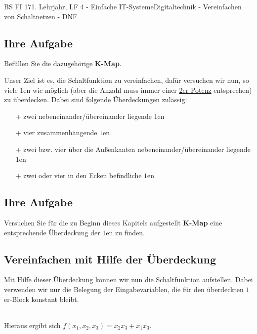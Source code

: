 \documentclass[11pt,twocolumn,oneside,openany,headings=optiontotoc,11pt,numbers=noenddot]{article}
\begin{document}
\begin{worksheet}{BS FI 17}{1. Lehrjahr, LF 4 - Einfache IT-Systeme}{Digitaltechnik - Vereinfachen von Schaltnetzen - DNF}
		\subsection*{Ihre Aufgabe} Befüllen Sie die dazugehörige \textbf{K-Map}.
		\begin{karnaugh-map}[4][4][1][$x_3x_4$][$x_1x_2$]
			
		\end{karnaugh-map}
		Unser Ziel ist es, die Schaltfunktion zu vereinfachen, dafür versuchen wir nun, so viele \(1\)en wie möglich (aber die Anzahl muss immer einer \underline{2er Potenz} entsprechen) zu überdecken. Dabei sind folgende Überdeckungen zulässig:
		\begin{itemize}
			\item[+] zwei nebeneinander/übereinander liegende \(1\)en
			\item[+] vier zusammenhängende \(1\)en
			\item[+] zwei bzw. vier über die Außenkanten nebeneinander/übereinander liegende \(1\)en
			\item[+] zwei oder vier in den Ecken befindliche \(1\)en
		\end{itemize}
		\begin{karnaugh-map}[4][4][1][$x_3x_4$][$x_1x_2$]
		\end{karnaugh-map}
		\begin{karnaugh-map}[4][4][1][$x_3x_4$][$x_1x_2$]
		\end{karnaugh-map}
		\begin{karnaugh-map}[4][4][1][$x_3x_4$][$x_1x_2$]
		\end{karnaugh-map}
		\begin{karnaugh-map}[4][4][1][$x_3x_4$][$x_1x_2$]
			\implicantcorner
		\end{karnaugh-map}
		\subsection*{Ihre Aufgabe} Versuchen Sie für die zu Beginn dieses Kapitels aufgestellt \textbf{K-Map} eine entsprechende Überdeckung der \(1\)en zu finden.\\
		\subsection{Vereinfachen mit Hilfe der Überdeckung}
		Mit Hilfe dieser Überdeckung können wir nun die Schaltfunktion aufstellen. Dabei verwenden wir nur die Belegung der Eingabevariablen, die für den überdeckten \(1\)er-Block konstant bleibt.
		\begin{karnaugh-map}[4][2][1][$x_2x_3$][$x_1$]
		\end{karnaugh-map}\\
		Hieraus ergibt sich \(f(x_1,x_2,x_3) = x_2x_3 + x_1x_3\).\\

\end{worksheet}
\end{document}

